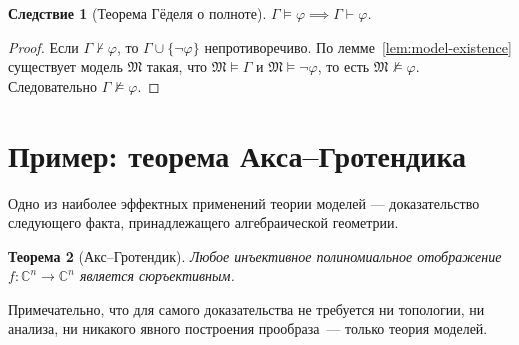 \documentclass[12pt, a4paper]{article}
\theoremstyle{plain}
\newtheorem{theorem}{Теорема}
\newtheorem{corollary}[theorem]{Следствие}
\theoremstyle{definition}
\newcommand{\proves}{\vdash}
\renewcommand{\models}{\vDash}
\newcommand{\Struct}{\mathfrak{M}}
\begin{document}
\begin{corollary}[Теорема Гёделя о полноте]
$\Gamma \models \varphi \implies \Gamma \proves \varphi$.
\end{corollary}

\begin{proof}
Если $\Gamma \not\proves \varphi$, то $\Gamma \cup \{\neg\varphi\}$ непротиворечиво.
По лемме~\ref{lem:model-existence} существует модель $\Struct$ такая,
что $\Struct \models \Gamma$ и $\Struct \models \neg\varphi$,
то есть $\Struct \not\models \varphi$.
Следовательно $\Gamma \not\models \varphi$.
\end{proof}

\section{Пример: теорема Акса–Гротендика}

Одно из наиболее эффектных применений теории моделей — доказательство
следующего факта, принадлежащего алгебраической геометрии.

\begin{theorem}[Акс–Гротендик]
Любое инъективное полиномиальное отображение $f \colon \mathbb{C}^n \to \mathbb{C}^n$
является сюръективным.
\end{theorem}

Примечательно, что для самого доказательства не требуется ни топологии,
ни анализа, ни никакого явного построения прообраза~--- только теория моделей.
\end{document}
